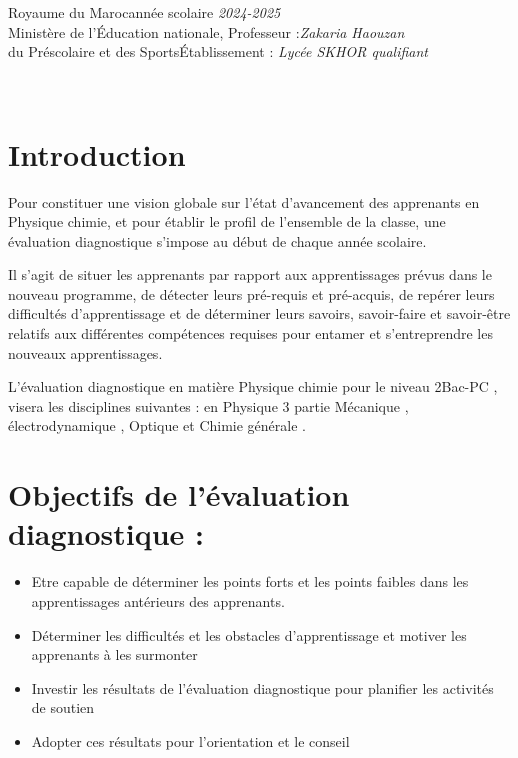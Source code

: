 \documentclass[12pt]{article}
\newcommand\headerMe[2]{\noindent{}#1\hfill#2}
\begin{document}
\headerMe{Royaume du Maroc}{année scolaire \emph{2024-2025}}\\
\headerMe{Ministère de l'Éducation nationale, }{  Professeur :\emph{Zakaria Haouzan}}\\
\headerMe{du Préscolaire et des Sports}{Établissement : \emph{Lycée SKHOR qualifiant}}\\

\begin{center}
\hrulefill
{}
\hrulefill\\
\end{center}


\section[A]{Introduction }
\hspace{0.5cm} Pour constituer une vision globale sur l’état d’avancement des apprenants en Physique chimie, et pour établir le profil de l’ensemble de la classe, une évaluation diagnostique s’impose au début de chaque année scolaire.

Il s’agit de situer les apprenants par rapport aux apprentissages prévus dans le nouveau programme, de détecter leurs pré-requis et pré-acquis, de repérer leurs difficultés d’apprentissage et de déterminer leurs savoirs, savoir-faire et savoir-être relatifs aux différentes compétences requises pour entamer et s’entreprendre les nouveaux apprentissages.

L’évaluation diagnostique en matière Physique chimie pour le niveau 2Bac-PC , visera les disciplines suivantes : en Physique 3 partie Mécanique , électrodynamique , Optique et Chimie générale .
\section{ Objectifs de l’évaluation diagnostique :}
\begin{itemize}
	\item Etre capable de déterminer les points forts et les points faibles dans les apprentissages antérieurs des apprenants.
	\item Déterminer les difficultés et les obstacles d’apprentissage et motiver les apprenants à les surmonter

	\item Investir les résultats de l’évaluation diagnostique pour planifier les activités de soutien
	\item Adopter ces résultats pour l’orientation et le conseil 

\end{itemize}
\end{document}
